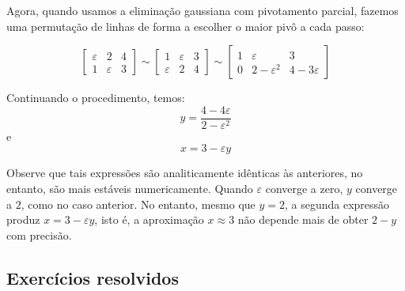 \begin{sol}
Agora, quando usamos a eliminação gaussiana com pivotamento parcial, fazemos uma permutação de linhas de forma a escolher o maior pivô a cada passo:

\begin{equation}\left[\begin{array}{cc|c}
\varepsilon & 2 & 4\\
1 & \varepsilon & 3
\end{array}
\right]\sim
\left[\begin{array}{cc|c}
1 & \varepsilon & 3\\
\varepsilon & 2 & 4
\end{array}
\right]\sim
\left[\begin{array}{cc|c}
1 & \varepsilon & 3\\
0 & 2-\varepsilon^2 & 4-3\varepsilon
\end{array}
\right]
\end{equation}

Continuando o procedimento, temos:
\begin{equation} y=\frac{4-4\varepsilon}{2-\varepsilon^2} \end{equation} e
\begin{equation} x=3-\varepsilon y \end{equation}

Observe que tais expressões são analiticamente idênticas às anteriores, no entanto, são mais estáveis numericamente. Quando $\varepsilon$ converge a zero, $y$ converge a $2$, como no caso anterior. No entanto, mesmo que $y=2$, a segunda expressão produz $x=3-\varepsilon y$, isto é, a aproximação $x\approx 3$ não depende mais de obter $2-y$ com precisão.
\end{sol}

\subsection*{Exercícios resolvidos}


